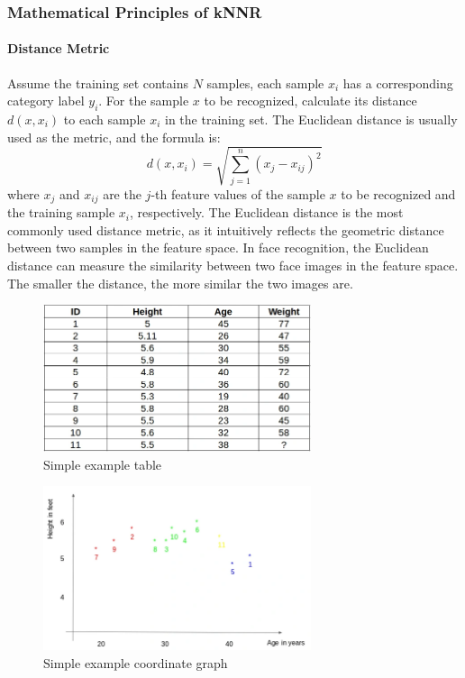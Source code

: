 \documentclass{article}
\begin{document}
\subsubsection{Mathematical Principles of kNNR}

\paragraph{Distance Metric}
Assume the training set contains \( N \) samples, each sample \( x_i \) has a corresponding category label \( y_i \). For the sample \( x \) to be recognized, calculate its distance \( d(x, x_i) \) to each sample \( x_i \) in the training set. The Euclidean distance is usually used as the metric, and the formula is:
\[
d(x, x_i) = \sqrt{\sum_{j=1}^{n} (x_j - x_{ij})^2}
\]
where \( x_j \) and \( x_{ij} \) are the \( j \)-th feature values of the sample \( x \) to be recognized and the training sample \( x_i \), respectively. The Euclidean distance is the most commonly used distance metric, as it intuitively reflects the geometric distance between two samples in the feature space. In face recognition, the Euclidean distance can measure the similarity between two face images in the feature space. The smaller the distance, the more similar the two images are.
\begin{figure}[H]
    \centering
    \includegraphics[width=0.7\textwidth]{Img/Screenshot-from-2018-08-22-15-03-42.png}
    \caption{Simple example table}
\end{figure}

\begin{figure}[H]
    \centering
    \includegraphics[width=0.7\textwidth]{Img/Screenshot-from-2018-08-22-12-49-19.png}
    \caption{Simple example coordinate graph}
\end{figure}
\end{document}
